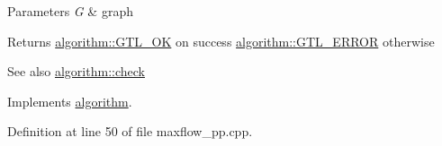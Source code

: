 \begin{DoxyParams}{Parameters}
{\em G} & graph \\
\hline
\end{DoxyParams}
\begin{DoxyReturn}{Returns}
{\ttfamily \mbox{\hyperlink{classalgorithm_af1a0078e153aa99c24f9bdf0d97f6710a5114c20e4a96a76b5de9f28bf15e282b}{algorithm\+::\+G\+T\+L\+\_\+\+OK}}} on success {\ttfamily \mbox{\hyperlink{classalgorithm_af1a0078e153aa99c24f9bdf0d97f6710a6fcf574690bbd6cf710837a169510dd7}{algorithm\+::\+G\+T\+L\+\_\+\+E\+R\+R\+OR}}} otherwise 
\end{DoxyReturn}
\begin{DoxySeeAlso}{See also}
\mbox{\hyperlink{classalgorithm_a76361fb03ad1cf643affc51821e43bed}{algorithm\+::check}} 
\end{DoxySeeAlso}


Implements \mbox{\hyperlink{classalgorithm_a76361fb03ad1cf643affc51821e43bed}{algorithm}}.



Definition at line 50 of file maxflow\+\_\+pp.\+cpp.


